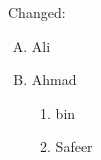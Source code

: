 \documentclass[]{article}
\begin{document}
	\vspace{2in}
	Changed: 
	\begin{enumerate}[A.]
		\item Ali
		\item Ahmad
		\begin{enumerate}
			\item[] bin  %
			\item Safeer
		\end{enumerate}
	\end{enumerate}
	
\end{document}
